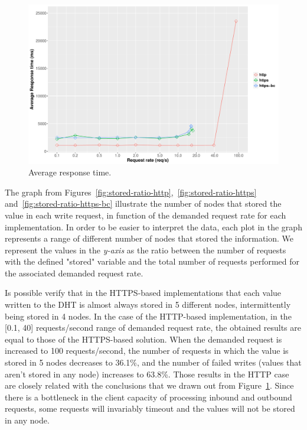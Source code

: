 \begin{figure}[h!]
  \centering
  \includegraphics[scale=0.4]{Figures/evaluation/average-response-time.pdf}
  \caption{Average response time.}
  \label{fig:average-response-time}
\end{figure}


The graph from Figures~\ref{fig:stored-ratio-http},~\ref{fig:stored-ratio-https} and~\ref{fig:stored-ratio-https-bc} illustrate the number of nodes that stored the value in each write request, in function of the demanded request rate for each implementation.
In order to be easier to interpret the data, each plot in the graph represents a range of different number of nodes that stored the information.
We represent the values in the \textit{y-axis} as the ratio between the number of requests with the defined "stored" variable and the total number of requests performed for the associated demanded request rate.

Is possible verify that in the HTTPS-based implementations that each value written to the DHT is almost always stored in 5 different nodes, intermittently being stored in 4 nodes.
In the case of the HTTP-based implementation, in the [0.1, 40] requests/second range of demanded request rate, the obtained results are equal to those of the HTTPS-based solution.
When the demanded request is increased to 100 requests/second, the number of requests in which the value is stored in 5 nodes decreases to 36.1\%, and the number of failed writes (values that aren't stored in any node) increases to 63.8\%.
Those results in the HTTP case are closely related with the conclusions that we drawn out from Figure~\ref{fig:average-response-time}.
Since there is a bottleneck in the client capacity of processing inbound and outbound requests, some requests will invariably timeout and the values will not be stored in any node.


